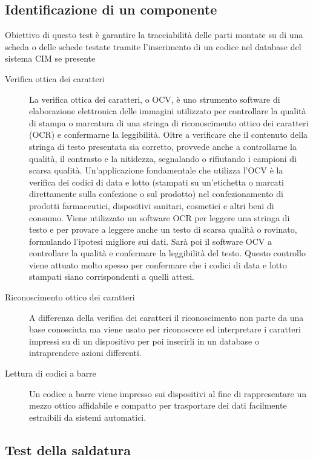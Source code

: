 \subsection{Identificazione di un componente}
Obiettivo di questo test è garantire la tracciabilità delle parti montate su di una scheda o delle schede
testate tramite l’inserimento di un codice nel database del sistema CIM se presente
\begin{description}
\item[Verifica ottica dei caratteri]
La verifica ottica dei caratteri, o OCV, è uno strumento software di elaborazione elettronica delle immagini utilizzato per controllare la qualità di stampa o marcatura di una stringa di riconoscimento ottico dei caratteri (OCR) e confermarne la leggibilità. Oltre a verificare che il contenuto della stringa di testo presentata sia corretto, provvede anche a controllarne la qualità, il contrasto e la nitidezza, segnalando o rifiutando i campioni di scarsa qualità.
Un’applicazione fondamentale che utilizza l’OCV è la verifica dei codici di data e lotto (stampati su un’etichetta o marcati direttamente sulla confezione o sul prodotto) nel confezionamento di prodotti farmaceutici, dispositivi sanitari, cosmetici e altri beni di consumo.
Viene utilizzato un software OCR per leggere una stringa di testo e per provare a leggere anche un testo di scarsa qualità o rovinato, formulando l’ipotesi migliore sui dati. Sarà poi il software OCV a controllare la qualità e confermare la leggibilità del testo. Questo controllo viene attuato molto spesso per confermare che i codici di data e lotto stampati siano corrispondenti a quelli attesi.
\item [Riconoscimento ottico dei caratteri] A differenza della verifica dei caratteri il riconoscimento non parte da una base conosciuta ma viene usato per riconoscere ed interpretare i caratteri impressi su di un dispositivo per poi inserirli in un database o intraprendere azioni differenti.
\item [Lettura di codici a barre] Un codice a barre viene impresso sui dispositivi al fine di rappresentare un mezzo ottico affidabile e compatto per trasportare dei dati facilmente estraibili da sistemi automatici.

\end{description}

\subsection{Test della saldatura}

